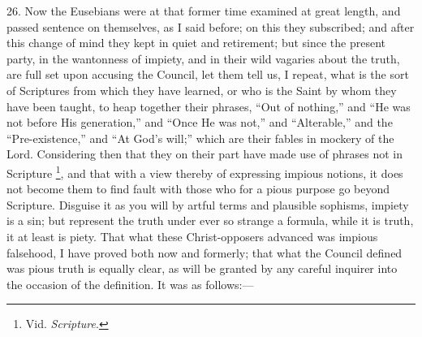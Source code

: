 
26. Now the Eusebians were at
that former time examined at great length, and passed sentence on
themselves, as I said before; on this they subscribed; and after this
change of mind they kept in quiet and retirement; but since the
present party, in the wantonness of impiety, and in their wild
vagaries about the truth, are full set upon accusing the Council, let
them tell us, I repeat, what is the sort of Scriptures from which they
have learned, or who is the Saint by whom they have been taught, to
heap together their phrases, ``Out of nothing,'' and ``He was not
before His generation,'' and ``Once He was not,'' and ``Alterable,'' and
the ``Pre-existence,'' and ``At God's will;'' which are their fables in
mockery of the Lord. Considering then that they on their part have
made use of phrases not in Scripture \footnote{Vid. \emph{Scripture}.}, and that with a view thereby of expressing impious notions,
it does not become them to find fault with those who for a pious
purpose go beyond Scripture. Disguise it as you will by artful terms
and plausible sophisms, impiety is a sin; but represent the truth
under ever so strange a formula, while it is truth, it at least is
piety. That what these Christ-opposers advanced was impious falsehood,
I have proved both now and formerly; that what the Council defined was
pious truth is equally clear, as will be granted by any careful
inquirer into the occasion of the definition. It was as follows:—

